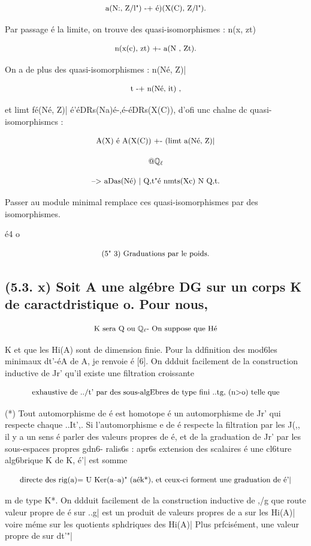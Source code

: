 \documentclass[11pt]{article}
\theoremstyle{remark}
\begin{document}
\[\text{\small a(N:, Z/l") -+ é)(X(C), Z/l").}\]

Par passage é la limite, on trouve des quasi-isomorphismes : n(x, zt)

\[\text{\small n(x(c), zt) +- a(N , Zt).}\]

On a de plus des quasi-isomorphismes : n(Né, Z)|

\[\text{\small t -+ n(Né, it) ,}\]

et limt fé(Né, Z)| é'éDRs(Na)é-,é-éDRs(X(C)), d'ofi unc chalne dc quasi-isomorphismcs :

\[\text{\small A(X) é A(X(C)) +- (limt a(Né, Z)|}\]

\[\text{\small @\(\mathbb{Q}_{\ell}\)}\]

\[\text{\small --> aDas(Né) | Q,t"é nmts(Xc) N Q,t.}\]

Passer au module minimal remplace ces quasi-isomorphismes par des isomorphismes.

é4 o

\[\text{\small (5" 3) Graduations par le poids.}\]

\subsection*{(5.3. x) Soit A une algébre DG sur un corps K de caractdristique o. Pour nous,}

\[\text{\small K sera Q ou \(\mathbb{Q}_{\ell}\)- On suppose que Hé}\]

K et que les Hi(A) sont de dimension finie. Pour la ddfinition des mod6les minimaux dt'-éA de A, je renvoie é [6]. On ddduit facilement de la construction inductive de Jr' qu'il existe une filtration croissante

\[\text{\small exhaustive de ../t' par des sous-algEbres de type fini ..tg, (n>o) telle que}\]

(*) Tout automorphisme de é est homotope é un automorphisme de Jr' qui respecte chaque ..It',. Si l'automorphisme e de é respecte la filtration par les J(,, il y a un sens é parler des valeurs propres de é, et de la graduation de Jr' par les sous-espaces propres gdn6- ralis6s : apr6s extension des scalaires é une cl6ture alg6brique K de K, é'| est somme

\[\text{\small directe des rig(a)= U Ker(a--a)" (aék*), et ceux-ci forment une graduation de é'|}\]

m de type K*. On ddduit facilement de la construction inductive de ,/g que route valeur propre de é sur ..g| est un produit de valeurs propres de a sur les Hi(A)| voire méme sur les quotients sphdriques des Hi(A)| Plus prfcisément, une valeur propre de sur dt'"|
\end{document}
